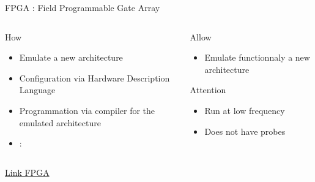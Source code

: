 %
\begin{Frame}{FPGA : Field Programmable Gate Array}
  \begin{columns}[t]
    \begin{column}{\BW} %
      \begin{block}{How}
        \begin{itemize}
        \item Emulate a new architecture
        \item Configuration via Hardware Description Language
        \item Programmation via compiler for the emulated architecture
        \item  : 
        \end{itemize}
      \end{block} 
    \end{column}
    
    \begin{column}{\BW} %
      \begin{block}{Allow}
        \begin{itemize}
      \item Emulate functionnaly a new architecture
        \end{itemize}
      \end{block}   
      \begin{alertblock}{Attention}
        \begin{itemize}
        \item Run at low frequency
        \item Does not have probes
        \end{itemize}
      \end{alertblock}
    \end{column}
  \end{columns} 
\href{https://en.wikipedia.org/wiki/Programmable_logic_device}{Link FPGA}
\end{Frame}


